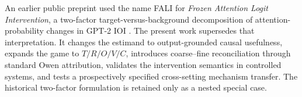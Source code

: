 An earlier public preprint used the name FALI for \emph{Frozen Attention Logit Intervention}, a two-factor target-versus-background decomposition of attention-probability changes in GPT-2 IOI \citep{sharmila2026attentionrepairs}. The present work supersedes that interpretation. It changes the estimand to output-grounded causal usefulness, expands the game to $T/R/O/V/C$, introduces coarse--fine reconciliation through standard Owen attribution, validates the intervention semantics in controlled systems, and tests a prospectively specified cross-setting mechanism transfer. The historical two-factor formulation is retained only as a nested special case.
